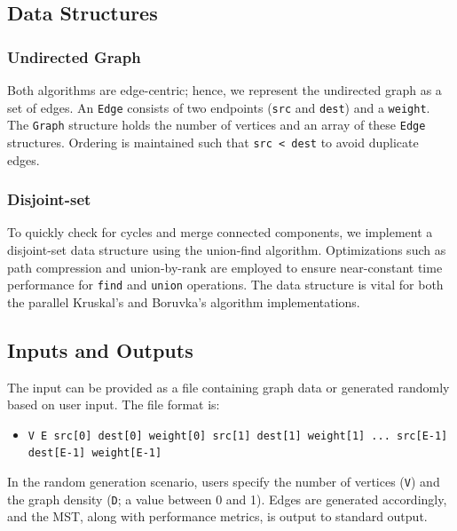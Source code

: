 \documentclass[a4paper, 12pt]{article}
\begin{document}
\subsection{Data Structures}
\subsubsection{Undirected Graph}
Both algorithms are edge-centric; hence, we represent the undirected graph as a set of edges. 
An \texttt{Edge} consists of two endpoints (\texttt{src} and \texttt{dest}) and a \texttt{weight}. 
The \texttt{Graph} structure holds the number of vertices and an array of these \texttt{Edge} structures. 
Ordering is maintained such that \texttt{src < dest} to avoid duplicate edges.

\subsubsection{Disjoint-set}
To quickly check for cycles and merge connected components, we implement a disjoint-set data 
structure using the union-find algorithm. Optimizations such as path compression and union-by-rank 
are employed to ensure near-constant time performance for \texttt{find} and \texttt{union} operations. 
The data structure is vital for both the parallel Kruskal's and Boruvka's algorithm implementations.

\subsection{Inputs and Outputs}
The input can be provided as a file containing graph data or generated randomly based on user input. 
The file format is:
\begin{itemize}
    \item \texttt{V E src[0] dest[0] weight[0] src[1] dest[1] weight[1] ... src[E-1] dest[E-1] weight[E-1]}
\end{itemize}
In the random generation scenario, users specify the number of vertices (\texttt{V}) and the graph density 
(\texttt{D}; a value between 0 and 1). Edges are generated accordingly, and the MST, along with performance metrics, 
is output to standard output.
\end{document}
